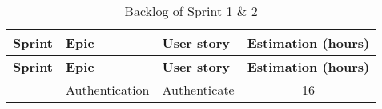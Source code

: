 \begin{longtable}{ | m{}  | m{} | m{} | c | }
    \caption{Backlog of Sprint 1 \& 2}                                                                                                       \\
    \hline
    \textbf{Sprint}         & \textbf{Epic}                                       & \textbf{User story}        & \textbf{Estimation (hours)} \\
    \hline
    \endfirsthead
    \hline
    \textbf{Sprint}         & \textbf{Epic}                                       & \textbf{User story}        & \textbf{Estimation (hours)} \\
    \hline
    \endhead
    \hline
    \endfoot
    \endlastfoot
    \multirow[t]{3}{5em}{1} & Authentication                                      & Authenticate               & 16                          \\


\end{longtable}
